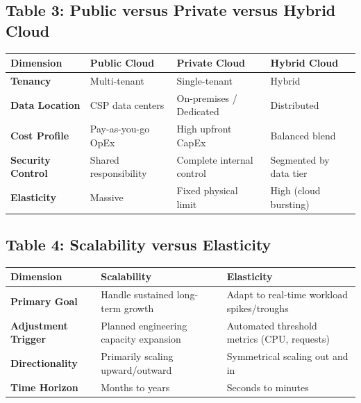 \subsection*{Table 3: Public versus Private versus Hybrid Cloud}
\begin{center}
\small
\begin{tabularx}{\textwidth}{lXXX}
\toprule
\textbf{Dimension} & \textbf{Public Cloud} & \textbf{Private Cloud} & \textbf{Hybrid Cloud} \\
\midrule
\textbf{Tenancy} & Multi-tenant & Single-tenant & Hybrid \\
\textbf{Data Location} & CSP data centers & On-premises / Dedicated & Distributed \\
\textbf{Cost Profile} & Pay-as-you-go OpEx & High upfront CapEx & Balanced blend \\
\textbf{Security Control} & Shared responsibility & Complete internal control & Segmented by data tier \\
\textbf{Elasticity} & Massive & Fixed physical limit & High (cloud bursting) \\
\bottomrule
\end{tabularx}
\end{center}

\subsection*{Table 4: Scalability versus Elasticity}
\begin{center}
\small
\begin{tabularx}{\textwidth}{lXX}
\toprule
\textbf{Dimension} & \textbf{Scalability} & \textbf{Elasticity} \\
\midrule
\textbf{Primary Goal} & Handle sustained long-term growth & Adapt to real-time workload spikes/troughs \\
\textbf{Adjustment Trigger} & Planned engineering capacity expansion & Automated threshold metrics (CPU, requests) \\
\textbf{Directionality} & Primarily scaling upward/outward & Symmetrical scaling out and in \\
\textbf{Time Horizon} & Months to years & Seconds to minutes \\
\bottomrule
\end{tabularx}
\end{center}

